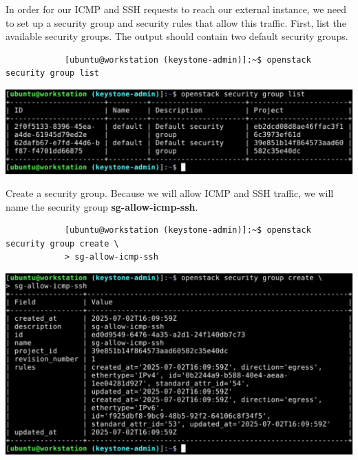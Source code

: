 \documentclass[letterpaper, 12pt]{article}
\begin{document}
\begin{enumerate}
    \begin{labstep}
        In order for our ICMP and SSH requests to reach our external instance, we need to set up a security group and security rules that allow this traffic.
        First, list the available security groups.
        The output should contain two default security groups.
        \begin{lstlisting}
            [ubuntu@workstation (keystone-admin)]:~$ openstack security group list
        \end{lstlisting}

        \begin{center}
            \includegraphics[width=\linewidth]{images/part9/step22.png}
        \end{center}
    \end{labstep}

    \begin{labstep}
        Create a security group.
        Because we will allow ICMP and SSH traffic, we will name the security group \textbf{sg-allow-icmp-ssh}.
        \begin{lstlisting}
            [ubuntu@workstation (keystone-admin)]:~$ openstack security group create \
            > sg-allow-icmp-ssh
        \end{lstlisting}

        \begin{center}
            \includegraphics[width=\linewidth]{images/part9/step23.png}
        \end{center}
    \end{labstep}


\end{enumerate}
\end{document}
